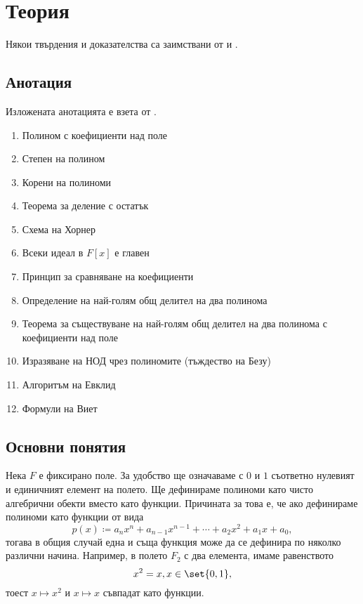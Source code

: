 \documentclass{../../common/topic}
\begin{document}
\maketitle

\section{Теория}

Някои твърдения и доказателства са заимствани от \cite{Knapp2016BasicAlgebra} и \cite{RoyachkiNotes}.

\subsection{Анотация}

Изложената анотацията е взета от \cite{Syllabus}.

\begin{enumerate}
  \item Полином с коефициенти над поле
  \item Степен на полином
  \item Корени на полиноми
  \item Теорема за деление с остатък
  \item Схема на Хорнер
  \item Всеки идеал в \( F[x] \) е главен
  \item Принцип за сравняване на коефициенти
  \item Определение на най-голям общ делител на два полинома
  \item Теорема за съществуване на най-голям общ делител на два полинома с коефициенти над поле
  \item Изразяване на НОД чрез полиномите (тъждество на Безу)
  \item Алгоритъм на Евклид
  \item Формули на Виет
\end{enumerate}

\subsection{Основни понятия}

Нека \( F \) е фиксирано поле. За удобство ще означаваме с \( 0 \) и \( 1 \) съответно нулевият и единичният елемент на полето. Ще дефинираме полиноми като чисто алгебрични обекти вместо като функции. Причината за това е, че ако дефинираме полиноми като функции от вида
\begin{equation*}
  p(x) \coloneqq a_n x^n + a_{n-1} x^{n-1} + \cdots + a_2 x^2 + a_1 x + a_0,
\end{equation*}
тогава в общия случай една и съща функция може да се дефинира по няколко различни начина. Например, в полето \( F_2 \) с два елемента, имаме равенството
\begin{equation*}
  x^2 = x, x \in \set{ 0, 1 },
\end{equation*}
тоест \( x \mapsto x^2 \) и \( x \mapsto x \) съвпадат като функции.
\end{document}
